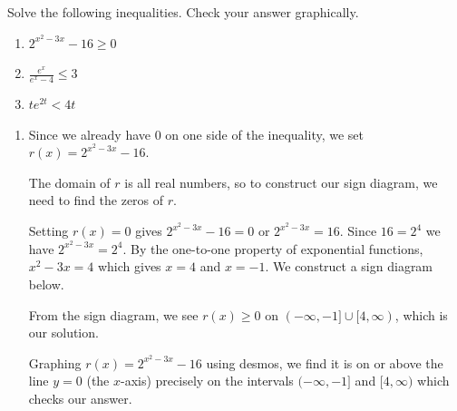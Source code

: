 \documentclass{ximera}
\begin{document}
\begin{example}  Solve the following inequalities.  Check your answer graphically.
\label{expineq}

\begin{enumerate}

\item \label{canuselogsex} $2^{x^2-3x} - 16 \geq 0$

\item  $\frac{e^{x}}{e^{x}-4} \leq 3$

\item  $t e^{2t} < 4t$

\end{enumerate}

\begin{explanation}

\begin{enumerate}

\item  Since we already have $0$ on one side of the inequality, we set $r(x) = 2^{x^2-3x} - 16$.  

The domain of $r$ is all real numbers, so to construct our sign diagram, we need to find the zeros of $r$.  

Setting $r(x) = 0$ gives $2^{x^2-3x} - 16 = 0$ or $2^{x^2-3x} = 16$.  Since $16 = 2^{4}$ we have $2^{x^2-3x} = 2^{4}$.   By the one-to-one property of exponential functions, $x^2 -3x = 4$ which gives $x=4$ and $x=-1$.  We construct a sign diagram below.

\begin{image}
% 
\end{image}


From the sign diagram, we see $r(x) \geq 0$ on $(-\infty, -1] \cup [4, \infty)$, which is our solution.  



Graphing $r(x) = 2^{x^2-3x} - 16$ using desmos,  we find it is on or above the line $y=0$ (the $x$-axis) precisely on the intervals  $(-\infty, -1]$ and $ [4, \infty)$ which checks our answer.


\end{enumerate}
\end{explanation}
\end{example}
\end{document}
